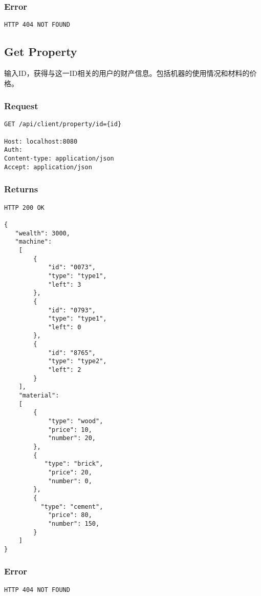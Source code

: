 \documentclass{article}
\begin{document}
\subsubsection*{Error}
\begin{lstlisting}
HTTP 404 NOT FOUND
\end{lstlisting}







\subsection{Get Property}
输入ID，获得与这一ID相关的用户的财产信息。包括机器的使用情况和材料的价格。
\subsubsection*{Request}
\begin{lstlisting}
GET /api/client/property/id={id}

Host: localhost:8080
Auth:
Content-type: application/json
Accept: application/json
\end{lstlisting}

\subsubsection*{Returns}
\begin{lstlisting}
HTTP 200 OK

{
   "wealth": 3000,
   "machine":
    [
        {
            "id": "0073",
            "type": "type1",
            "left": 3
        },
        {
            "id": "0793",
            "type": "type1",
            "left": 0
        },
        {
            "id": "8765",
            "type": "type2",
            "left": 2
        }
    ],
    "material":
    [
        {
            "type": "wood",
            "price": 10,
            "number": 20,
        },
        {
           "type": "brick",
            "price": 20,
            "number": 0,
        },
        {
          "type": "cement",
            "price": 80,
            "number": 150,
        }
    ]
}
\end{lstlisting}

\subsubsection*{Error}
\begin{lstlisting}
HTTP 404 NOT FOUND
\end{lstlisting}
\end{document}
